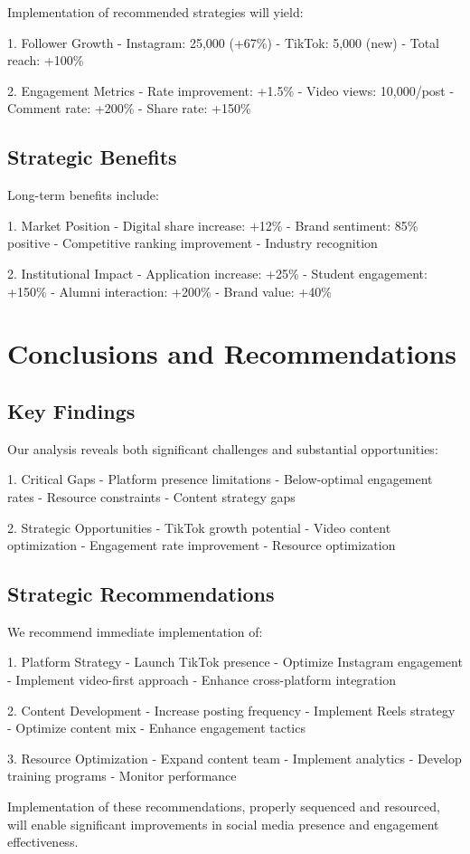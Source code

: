 \documentclass[12pt]{report}
\begin{document}
Implementation of recommended strategies will yield:

1. Follower Growth
   - Instagram: 25,000 (+67\%)
   - TikTok: 5,000 (new)
   - Total reach: +100\%

2. Engagement Metrics
   - Rate improvement: +1.5\%
   - Video views: 10,000/post
   - Comment rate: +200\%
   - Share rate: +150\%

\section{Strategic Benefits}

Long-term benefits include:

1. Market Position
   - Digital share increase: +12\%
   - Brand sentiment: 85\% positive
   - Competitive ranking improvement
   - Industry recognition

2. Institutional Impact
   - Application increase: +25\%
   - Student engagement: +150\%
   - Alumni interaction: +200\%
   - Brand value: +40\%

\chapter{Conclusions and Recommendations}

\section{Key Findings}

Our analysis reveals both significant challenges and substantial opportunities:

1. Critical Gaps
   - Platform presence limitations
   - Below-optimal engagement rates
   - Resource constraints
   - Content strategy gaps

2. Strategic Opportunities
   - TikTok growth potential
   - Video content optimization
   - Engagement rate improvement
   - Resource optimization

\section{Strategic Recommendations}

We recommend immediate implementation of:

1. Platform Strategy
   - Launch TikTok presence
   - Optimize Instagram engagement
   - Implement video-first approach
   - Enhance cross-platform integration

2. Content Development
   - Increase posting frequency
   - Implement Reels strategy
   - Optimize content mix
   - Enhance engagement tactics

3. Resource Optimization
   - Expand content team
   - Implement analytics
   - Develop training programs
   - Monitor performance

Implementation of these recommendations, properly sequenced and resourced, will enable significant improvements in social media presence and engagement effectiveness.
\end{document}
